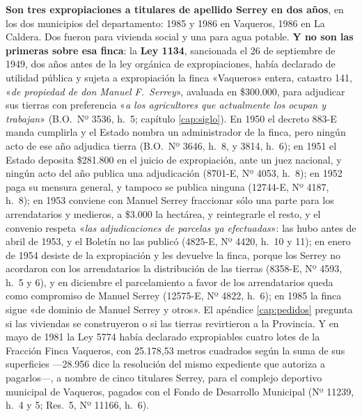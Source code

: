 \textbf{Son tres expropiaciones a titulares de apellido Serrey en dos años}, en los dos municipios del departamento: 1985 y 1986 en Vaqueros, 1986 en La Caldera. Dos fueron para vivienda social y una para agua potable. \textbf{Y no son las primeras sobre esa finca}: la \textbf{Ley 1134}, sancionada el 26 de septiembre de 1949, dos años antes de la ley orgánica de expropiaciones, había declarado de utilidad pública y sujeta a expropiación la finca «Vaqueros» entera, catastro 141, «\textit{de propiedad de don Manuel F.\ Serrey}», avaluada en \$300.000, para adjudicar sus tierras con preferencia «\textit{a los agricultores que actualmente los ocupan y trabajan}» (B.O.\ Nº 3536, h.\ 5; capítulo \ref{cap:siglo}). En 1950 el decreto 883-E manda cumplirla y el Estado nombra un administrador de la finca, pero ningún acto de ese año adjudica tierra (B.O.\ Nº 3646, h.\ 8, y 3814, h.\ 6); en 1951 el Estado deposita \$281.800 en el juicio de expropiación, ante un juez nacional, y ningún acto del año publica una adjudicación (8701-E, Nº 4053, h.\ 8); en 1952 paga su mensura general, y tampoco se publica ninguna (12744-E, Nº 4187, h.\ 8); en 1953 conviene con Manuel Serrey fraccionar sólo una parte para los arrendatarios y medieros, a \$3.000 la hectárea, y reintegrarle el resto, y el convenio respeta «\textit{las adjudicaciones de parcelas ya efectuadas}»: las hubo antes de abril de 1953, y el Boletín no las publicó (4825-E, Nº 4420, h.\ 10 y 11); en enero de 1954 desiste de la expropiación y les devuelve la finca, porque los Serrey no acordaron con los arrendatarios la distribución de las tierras (8358-E, Nº 4593, h.\ 5 y 6), y en diciembre el parcelamiento a favor de los arrendatarios queda como compromiso de Manuel Serrey (12575-E, Nº 4822, h.\ 6); en 1985 la finca sigue «de dominio de Manuel Serrey y otros». El apéndice \ref{cap:pedidos} pregunta si las viviendas se construyeron o si las tierras revirtieron a la Provincia. Y en mayo de 1981 la Ley 5774 había declarado expropiables cuatro lotes de la Fracción Finca Vaqueros, con 25.178,53 metros cuadrados según la suma de sus superficies ---28.956 dice la resolución del mismo expediente que autoriza a pagarlos---, a nombre de cinco titulares Serrey, para el complejo deportivo municipal de Vaqueros, pagados con el Fondo de Desarrollo Municipal (Nº 11239, h.\ 4 y 5; Res.\ 5, Nº 11166, h.\ 6).

